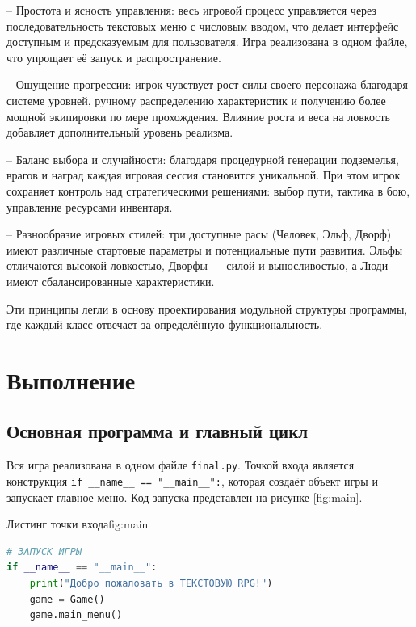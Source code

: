 \documentclass[]{vvsu}
\begin{document}
– Простота и ясность управления: весь игровой процесс управляется через последовательность текстовых меню с числовым вводом, что делает интерфейс доступным и предсказуемым для пользователя. Игра реализована в одном файле, что упрощает её запуск и распространение.

– Ощущение прогрессии: игрок чувствует рост силы своего персонажа благодаря системе уровней, ручному распределению характеристик и получению более мощной экипировки по мере прохождения. Влияние роста и веса на ловкость добавляет дополнительный уровень реализма.

– Баланс выбора и случайности: благодаря процедурной генерации подземелья, врагов и наград каждая игровая сессия становится уникальной. При этом игрок сохраняет контроль над стратегическими решениями: выбор пути, тактика в бою, управление ресурсами инвентаря.

– Разнообразие игровых стилей: три доступные расы (Человек, Эльф, Дворф) имеют различные стартовые параметры и потенциальные пути развития. Эльфы отличаются высокой ловкостью, Дворфы — силой и выносливостью, а Люди имеют сбалансированные характеристики.

Эти принципы легли в основу проектирования модульной структуры программы, где каждый класс отвечает за определённую функциональность.

\section{Выполнение}

\subsection{Основная программа и главный цикл}

Вся игра реализована в одном файле \texttt{final.py}. Точкой входа является конструкция \texttt{if \_\_name\_\_ == "\_\_main\_\_":}, которая создаёт объект игры и запускает главное меню. Код запуска представлен на рисунке \ref{fig:main}.

\begin{vvsu_figure}{Листинг точки входа}{fig:main}
  \begin{minipage}{.95\textwidth}
    \begin{lstlisting}[language=Python]
# ЗАПУСК ИГРЫ
if __name__ == "__main__":
    print("Добро пожаловать в ТЕКСТОВУЮ RPG!")
    game = Game()
    game.main_menu()
    \end{lstlisting}
  \end{minipage}
\end{vvsu_figure}
\end{document}
